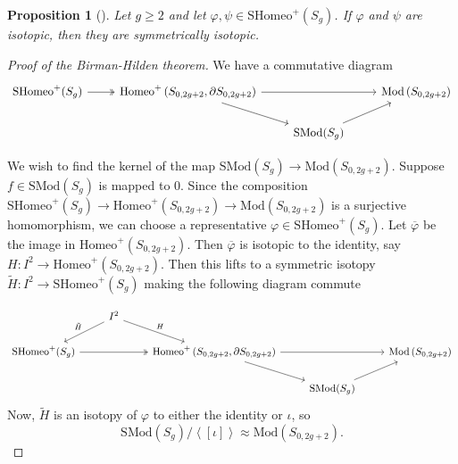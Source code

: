 \documentclass[reqno]{amsart}
\newtheorem{proposition}[theorem]{Proposition}
\theoremstyle{definition}
\theoremstyle{remark}
\newcommand{\Mod}{{\mathrm{Mod}}}
\newcommand{\SMod}{{\mathrm{SMod}}}
\newcommand{\Homeo}{{\mathrm{Homeo}}}
\newcommand{\SHomeo}{{\mathrm{SHomeo}}}
\begin{document}
   \begin{proposition}[]
       Let $g \ge 2$ and let $\varphi , \psi \in 
       \SHomeo^{+} (S_g)$. If $\varphi $ and $\psi$ are
       isotopic, then they are symmetrically isotopic.
   \end{proposition}

   \begin{proof}[Proof of the Birman-Hilden theorem]
       We have a commutative diagram
       \begin{equation*}
       \begin{tikzcd}
           \SHomeo^{+} (S_g) \ar[r, twoheadrightarrow] & 
           \Homeo^{+}\left( S_{0,2g+2}, \partial
           S_{0,2g+2}\right) 
           \ar[rr] \ar[dr] & & \Mod \left( S_{0,2g+2} \right) \\
                           & & \SMod(S_g)  \ar[ru] &
       \end{tikzcd}
       \end{equation*}

       We wish to find the kernel of
       the map $\SMod (S_g) \to \Mod \left( S_{0,2g+2} \right) $.
       Suppose $f \in \SMod(S_g)$ is mapped
       to $0$. Since the composition
       $\SHomeo^{+}(S_g) \to \Homeo^{+} \left( S_{0,2g+2} \right) 
       \to \Mod \left( S_{0,2g+2} \right) $ is a surjective
       homomorphism, we can choose a representative
       $\varphi  \in \SHomeo^{+} \left( S_g \right) $.
       Let $\overline{\varphi  }$ be the image
       in $\Homeo^{+} \left( S_{0,2g+2} \right) $.
       Then $\overline{\varphi }$ is isotopic to
       the identity, say $H \colon I^2 \to 
       \Homeo^{+} \left( S_{0,2g+2} \right) $. Then
       this lifts to a symmetric isotopy
       $\tilde{H} \colon I^2 \to \SHomeo^{+} \left( S_g \right) $ 
       making the following diagram commute

       \begin{equation*}
       \begin{tikzcd}
           & I^2 \ar[dl, "\tilde{H}"'] \ar[dr, "H"] & & &\\
           \SHomeo^{+} (S_g) \ar[rr, twoheadrightarrow] & &
           \Homeo^{+}\left( S_{0,2g+2}, \partial
           S_{0,2g+2}\right) 
           \ar[rr] \ar[dr] & & \Mod \left( S_{0,2g+2} \right) \\
                           &  & & \SMod(S_g)  \ar[ru] &
       \end{tikzcd}
       \end{equation*}
       Now, $\tilde{H}$ is an isotopy of $\varphi $ to
       either the identity or $\iota$, so
       \[
       \SMod \left( S_g \right) / \left<\left[ \iota \right]  \right>
       \approx \Mod \left( S_{0,2g+2} \right) .
       \] 
       
   \end{proof}
\end{document}
